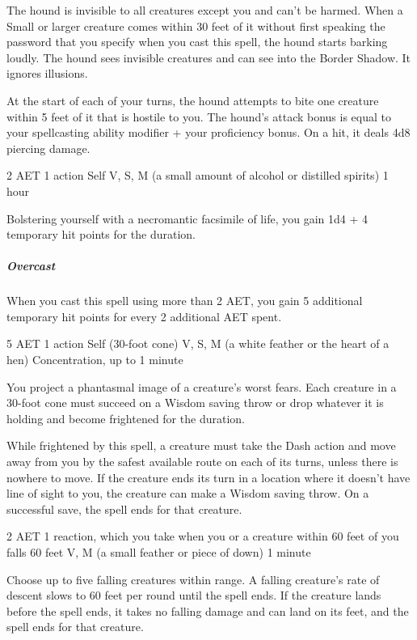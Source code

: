 The hound is invisible to all creatures except you and can't be harmed. When a Small or larger creature comes within 30 feet of it without first speaking the password that you specify when you cast this spell, the hound starts barking loudly. The hound sees invisible creatures and can see into the Border Shadow. It ignores illusions.

At the start of each of your turns, the hound attempts to bite one creature within 5 feet of it that is hostile to you. The hound's attack bonus is equal to your spellcasting ability modifier + your proficiency bonus. On a hit, it deals 4d8 piercing damage.


{2 AET}
{1 action}
{Self}
{V, S, M (a small amount of alcohol or distilled spirits)}
{1 hour}

Bolstering yourself with a necromantic facsimile of life, you gain 1d4 + 4 temporary hit points for the duration.

\subparagraph*{Overcast} When you cast this spell using more than 2 AET, you gain 5 additional temporary hit points for every 2 additional AET spent.


{5 AET}
{1 action}
{Self (30-foot cone)}
{V, S, M (a white feather or the heart of a hen)}
{Concentration, up to 1 minute}

You project a phantasmal image of a creature's worst fears. Each creature in a 30-foot cone must succeed on a Wisdom saving throw or drop whatever it is holding and become frightened for the duration.

While frightened by this spell, a creature must take the Dash action and move away from you by the safest available route on each of its turns, unless there is nowhere to move. If the creature ends its turn in a location where it doesn't have line of sight to you, the creature can make a Wisdom saving throw. On a successful save, the spell ends for that creature.


{2 AET}
{1 reaction, which you take when you or a creature within 60 feet of you falls}
{60 feet}
{V, M (a small feather or piece of down)}
{1 minute}

Choose up to five falling creatures within range. A falling creature's rate of descent slows to 60 feet per round until the spell ends. If the creature lands before the spell ends, it takes no falling damage and can land on its feet, and the spell ends for that creature.


